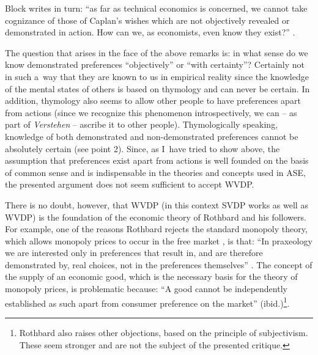 Block writes in turn: ``as far as technical economics is concerned, we cannot take cognizance of those of Caplan's wishes which are not objectively revealed or demonstrated in action. How can we, as economists, even know they exist?'' 
\parencite[][p.23]{block_austrian_1999}.%




The question that arises in the face of the above remarks is: in what sense do we know demonstrated preferences ``objectively'' or ``with certainty''? Certainly not in such a~way that they are known to us in empirical reality since the knowledge of the mental states of others is based on thymology and can never be certain. In addition, thymology also seems to allow other people to have preferences apart from actions (since we recognize this phenomenon introspectively, we can -- as part of \textit{Verstehen} -- ascribe it to other people). Thymologically speaking, knowledge of both demonstrated and non-demonstrated preferences cannot be absolutely certain (see point 2). Since, as I~have tried to show above, the assumption that preferences exist apart from actions is well founded on the basis of common sense and is indispensable in the theories and concepts used in ASE, the presented argument does not seem sufficient to accept WVDP.



There is no doubt, however, that WVDP (in this context SVDP works as well as WVDP) is the foundation of the economic theory of Rothbard and his followers. For example, one of the reasons Rothbard rejects the standard monopoly theory, which allows monopoly prices to occur in the free market 
\parencite[whichsee:][]{mises_human_1998}, %
 is that: ``In praxeology we are interested only in preferences that result in, and are therefore demonstrated by, real choices, not in the preferences themselves'' 
\parencite[][p.701]{rothbard_man_2009}. %
 The concept of the supply of an economic good, which is the necessary basis for the theory of monopoly prices, is problematic because: ``A good cannot be independently established as such apart from consumer preference on the market'' (ibid.)\footnote{Rothbard also raises other objections, based on the principle of subjectivism. These seem stronger and are not the subject of the presented critique.}.



